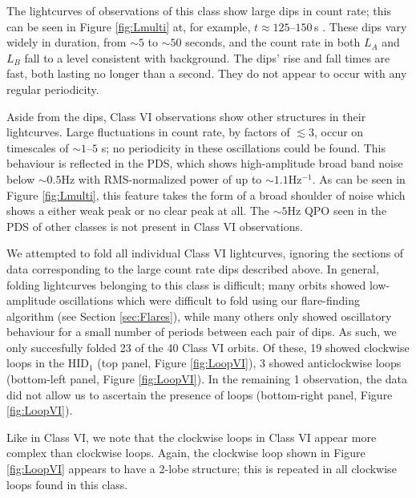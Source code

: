 \par The lightcurves of observations of this class show large dips in count rate; this can be seen in Figure \ref{fig:Lmulti} at, for example, $t\approx125$--$150$\,s .  These dips vary widely in duration, from $\sim5$ to $\sim50$ seconds, and the count rate in both $L_A$ and $L_B$ fall to a level consistent with background.  The dips' rise and fall times are fast, both lasting no longer than a second.  They do not appear to occur with any regular periodicity.
\par Aside from the dips, Class VI observations show other structures in their lightcurves.  Large fluctuations in count rate, by factors of $\lesssim3$, occur on timescales of $\sim1\mbox{--}5$ s; no periodicity in these oscillations could be found.  This behaviour is reflected in the PDS, which shows high-amplitude broad band noise below $\sim0.5$Hz with RMS-normalized power \citep{Belloni_RMSNorm} of up to $\sim1.1 $Hz$^{-1}$.  As can be seen in Figure \ref{fig:Lmulti}, this feature takes the form of a broad shoulder of noise which shows a either weak peak or no clear peak at all.  The $\sim5$Hz QPO seen in the PDS of other classes is not present in Class VI observations.
\par We attempted to fold all individual Class VI lightcurves, ignoring the sections of data corresponding to the large count rate dips described above.  In general, folding lightcurves belonging to this class is difficult; many orbits showed low-amplitude oscillations which were difficult to fold using our flare-finding algorithm (see Section \ref{sec:Flares}), while many others only showed oscillatory behaviour for a small number of periods between each pair of dips.  As such, we only succesfully folded 23 of the 40 Class VI orbits.  Of these, 19 showed clockwise loops in the HID$_1$ (top panel, Figure \ref{fig:LoopVI}), 3 showed anticlockwise loops (bottom-left panel, Figure \ref{fig:LoopVI}).  In the remaining 1 observation, the data did not allow us to ascertain the presence of loops (bottom-right panel, Figure \ref{fig:LoopVI}).
\par Like in Class VI, we note that the clockwise loops in Class VI appear more complex than clockwise loops.  Again, the clockwise loop shown in Figure \ref{fig:LoopVI} appears to have a 2-lobe structure; this is repeated in all clockwise loops found in this class.

